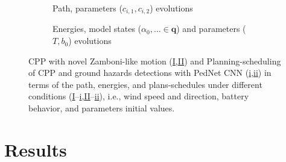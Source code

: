 \documentclass[letterpaper,10pt,journal,twoside]{IEEEtran}
\newcommand{\figpath}{./figures}
\theoremstyle{definition}
\begin{document}
\begin{figure*}
  \centering
  \begin{subfigure}{.4\textwidth}
    \centering
    \footnotesize
    
    \caption{Path, parameters ($c_{i,1},c_{i,2}$) evolutions}
    \label{fig:trajs}
  \end{subfigure}\hspace*{3ex}
  \begin{subfigure}{.54\textwidth}
    \centering
    \footnotesize
    
    \caption{Energies, model states ($\alpha_0,\dots\in\mathbf{q}$) and parameters ($T,b_0$) evolutions}
    \label{fig:ener}
  \end{subfigure}
  \footnotesize
  \caption{CPP with novel Zamboni-like motion (\hyperref[fig:trajs-I-static]{I},\hyperref[fig:trajs-II-static]{II}) and Planning-scheduling of CPP and ground hazards detections with PedNet CNN (\hyperref[fig:trajs-dyn-i]{i},\hyperref[fig:trajs-dyn-ii]{ii}) in terms of the path, energies, and plans-schedules under different conditions (\hyperref[fig:trajs-I-static]{I}--\hyperref[fig:trajs-dyn-i]{i},\hyperref[fig:trajs-II-static]{II}--\hyperref[fig:trajs-dyn-ii]{ii}), i.e., wind speed and direction, battery behavior, and parameters initial values.}
  \label{fig:res}
\end{figure*}

\section{Results}         %
\label{sec:experimental}  %

\end{document}
